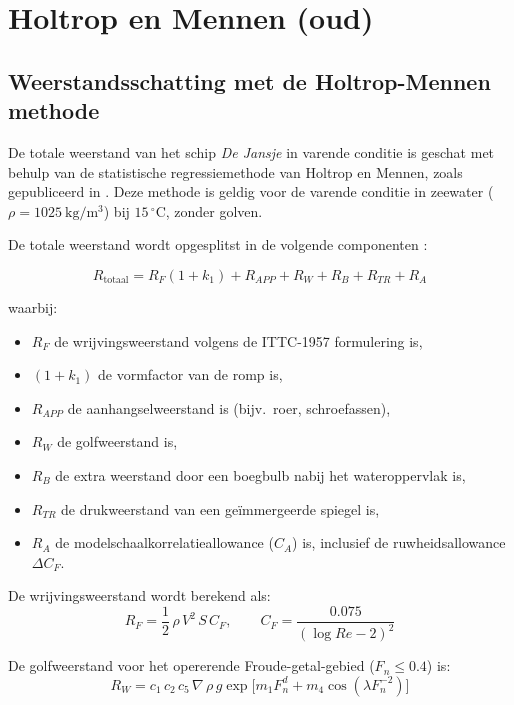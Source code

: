 \chapter{Holtrop en Mennen (oud)}
\section{Weerstandsschatting met de Holtrop-Mennen methode}
\label{sec:holtrop}

De totale weerstand van het schip \emph{De Jansje} in varende conditie is geschat met behulp van de statistische regressiemethode van Holtrop en Mennen, zoals gepubliceerd in \cite{Holtrop1984}. Deze methode is geldig voor de varende conditie in zeewater ($\rho = 1025\ \mathrm{kg/m^3}$) bij $15\,^{\circ}\mathrm{C}$, zonder golven.

De totale weerstand wordt opgesplitst in de volgende componenten \cite{Holtrop1984}:

\begin{equation}
    R_\mathrm{totaal} = R_F(1+k_1) + R_{APP} + R_W + R_B + R_{TR} + R_A
    \label{eq:Rtot}
\end{equation}

\noindent waarbij:
\begin{itemize}
    \item $R_F$ de wrijvingsweerstand volgens de ITTC-1957 formulering is,
    \item $(1+k_1)$ de vormfactor van de romp is,
    \item $R_{APP}$ de aanhangselweerstand is (bijv.\ roer, schroefassen),
    \item $R_W$ de golfweerstand is,
    \item $R_B$ de extra weerstand door een boegbulb nabij het wateroppervlak is,
    \item $R_{TR}$ de drukweerstand van een geïmmergeerde spiegel is,
    \item $R_A$ de modelschaalkorrelatieallowance ($C_A$) is, inclusief de ruwheidsallowance $\Delta C_F$.
\end{itemize}

De wrijvingsweerstand wordt berekend als:
\begin{equation}
    R_F = \frac{1}{2}\,\rho\,V^2\,S\,C_F, \qquad
    C_F = \frac{0.075}{(\log Re - 2)^2}
    \label{eq:RF}
\end{equation}

De golfweerstand voor het opererende Froude-getal-gebied ($F_n \leq 0.4$) is:
\begin{equation}
    R_W = c_1\,c_2\,c_5\,\nabla\,\rho\,g \exp\!\bigl[m_1 F_n^d + m_4 \cos(\lambda F_n^{-2})\bigr]
    \label{eq:RW}
\end{equation}

